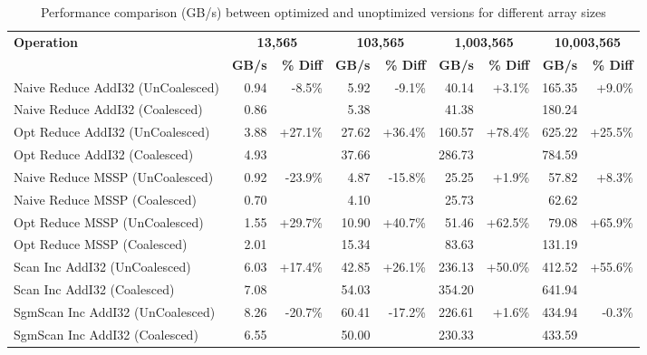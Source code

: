 \documentclass{article}
\begin{document}
\begin{table}[h]
  \centering
  \small
  \setlength{\tabcolsep}{1pt}
  \begin{tabular}{|l|r|r|r|r|r|r|r|r|}
  \hline
  \multirow{2}{*}{\textbf{Operation}} & \multicolumn{2}{c|}{\textbf{13,565}} & \multicolumn{2}{c|}{\textbf{103,565}} & \multicolumn{2}{c|}{\textbf{1,003,565}} & \multicolumn{2}{c|}{\textbf{10,003,565}} \\
  \cline{2-9}
   & \textbf{GB/s} & \textbf{\% Diff} & \textbf{GB/s} & \textbf{\% Diff} & \textbf{GB/s} & \textbf{\% Diff} & \textbf{GB/s} & \textbf{\% Diff} \\
  \hline
  Naive Reduce AddI32 (UnCoalesced) & 0.94 & \multirow{2}{*}{-8.5\%} & 5.92 & \multirow{2}{*}{-9.1\%} & 40.14 & \multirow{2}{*}{+3.1\%} & 165.35 & \multirow{2}{*}{+9.0\%} \\
  Naive Reduce AddI32 (Coalesced) & 0.86 & & 5.38 & & 41.38 & & 180.24 & \\
  \hline
  Opt Reduce AddI32 (UnCoalesced) & 3.88 & \multirow{2}{*}{+27.1\%} & 27.62 & \multirow{2}{*}{+36.4\%} & 160.57 & \multirow{2}{*}{+78.4\%} & 625.22 & \multirow{2}{*}{+25.5\%} \\
  Opt Reduce AddI32 (Coalesced) & 4.93 & & 37.66 & & 286.73 & & 784.59 & \\
  \hline
  Naive Reduce MSSP (UnCoalesced) & 0.92 & \multirow{2}{*}{-23.9\%} & 4.87 & \multirow{2}{*}{-15.8\%} & 25.25 & \multirow{2}{*}{+1.9\%} & 57.82 & \multirow{2}{*}{+8.3\%} \\
  Naive Reduce MSSP (Coalesced) & 0.70 & & 4.10 & & 25.73 & & 62.62 & \\
  \hline
  Opt Reduce MSSP (UnCoalesced) & 1.55 & \multirow{2}{*}{+29.7\%} & 10.90 & \multirow{2}{*}{+40.7\%} & 51.46 & \multirow{2}{*}{+62.5\%} & 79.08 & \multirow{2}{*}{+65.9\%} \\
  Opt Reduce MSSP (Coalesced) & 2.01 & & 15.34 & & 83.63 & & 131.19 & \\
  \hline
  Scan Inc AddI32 (UnCoalesced) & 6.03 & \multirow{2}{*}{+17.4\%} & 42.85 & \multirow{2}{*}{+26.1\%} & 236.13 & \multirow{2}{*}{+50.0\%} & 412.52 & \multirow{2}{*}{+55.6\%} \\
  Scan Inc AddI32 (Coalesced) & 7.08 & & 54.03 & & 354.20 & & 641.94 & \\
  \hline
  SgmScan Inc AddI32 (UnCoalesced) & 8.26 & \multirow{2}{*}{-20.7\%} & 60.41 & \multirow{2}{*}{-17.2\%} & 226.61 & \multirow{2}{*}{+1.6\%} & 434.94 & \multirow{2}{*}{-0.3\%} \\
  SgmScan Inc AddI32 (Coalesced) & 6.55 & & 50.00 & & 230.33 & & 433.59 & \\
  \hline
  \end{tabular}
  \caption{Performance comparison (GB/s) between optimized and unoptimized versions for different array sizes}
  \label{tab:performance_comparison}
  \end{table}
\end{document}
